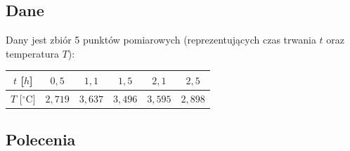 \documentclass[a4paper,11pt]{article}
\begin{document}
\subsection*{Dane}

Dany jest zbiór 5 punktów pomiarowych (reprezentujących czas trwania $t$ oraz temperatura $T$):

\begin{center}
\begin{tabular}{c|ccccc}
  \toprule
  $t$ [$h$] & $0{,}5$ & $1{,}1$ & $1{,}5$ & $2{,}1$ & $2{,}5$ \\
  \midrule
  $T$ [$^\circ\text{C}$] & $2{,}719$ & $3{,}637$ & $3{,}496$ & $3{,}595$ & $2{,}898$ \\
  \bottomrule
\end{tabular}
\end{center}

\subsection*{Polecenia}
\end{document}
